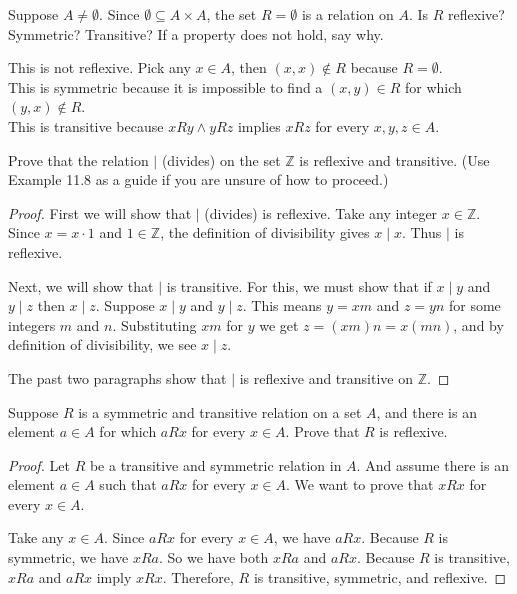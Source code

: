 \documentclass[DIN, pagenumber=false, fontsize=11pt, parskip=half]{scrartcl}
\begin{document}
\begin{problems}
    \problem Suppose $A \neq \emptyset$. Since $\emptyset \subseteq A \times A$, the set $R = \emptyset$ is a relation on $A$. Is $R$ reflexive? Symmetric? Transitive? If a property does not hold, say why.

    \answer This is not reflexive. Pick any $x \in A$, then $(x,x) \notin R$ because $R = \emptyset$.\\ 
    This is symmetric because it is impossible to find a $(x,y) \in R$ for which $(y,x) \notin R$.\\ 
    This is transitive because $xRy \land yRz$ implies $xRz$ for every $x,y,z \in A$.

    \problem Prove that the relation $|$ (divides) on the set $\mathbb{Z}$ is reflexive and transitive. (Use Example 11.8 as a guide if you are unsure of how to proceed.)

    \begin{proof}
        First we will show that $\mid$ (divides) is reflexive. Take any integer $x \in \mathbb{Z}$. Since $x = x \cdot 1$ and $1 \in \mathbb{Z}$, the definition of divisibility gives $x \mid x$. Thus $\mid$ is reflexive.

        Next, we will show that $\mid$ is transitive. For this, we must show that if $x \mid y$ and $y \mid z$ then $x \mid z$.
        Suppose $x \mid y$ and $y \mid z$. This means $y = xm$ and $z = yn$ for some integers $m$ and $n$. Substituting $xm$ for $y$ we get $z = (xm)n = x(mn)$, and by definition of divisibility, we see $x \mid z$.

        The past two paragraphs show that $\mid$ is reflexive and transitive on $\mathbb{Z}$.
    \end{proof}

    \problem Suppose $R$ is a symmetric and transitive relation on a set $A$, and there is an element $a \in A$ for which $aRx$ for every $x \in A$. Prove that $R$ is reflexive.

    \answer
    \begin{proof}
        Let $R$ be a transitive and symmetric relation in $A$. And assume there is an element $a \in A$ such that $aRx$ for every $x \in A$. We want to prove that $xRx$ for every $x \in A$.

        Take any $x \in A$.
        Since $aRx$ for every $x \in A$, we have $aRx$.
        Because $R$ is symmetric, we have $xRa$.
        So we have both $xRa$ and $aRx$.
        Because $R$ is transitive, $xRa$ and $aRx$ imply $xRx$.
        Therefore, $R$ is transitive, symmetric, and reflexive.
    \end{proof}


\end{problems}
\end{document}
